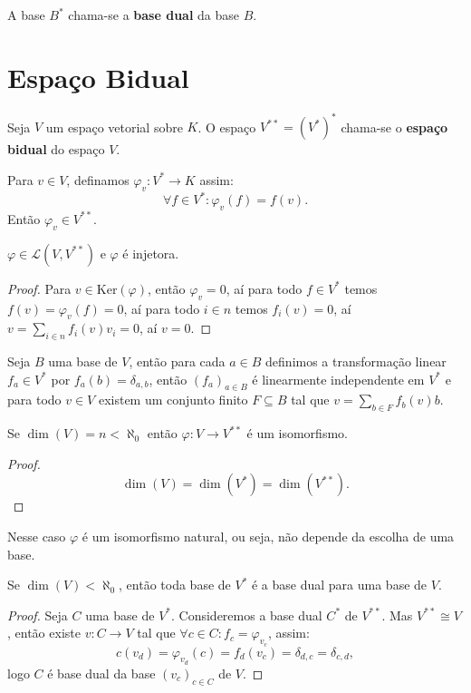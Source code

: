 \documentclass[11pt,twoside,a4paper]{book}
\begin{document}
\begin{definicao}
A base $B^*$ chama-se a \textbf{base dual} da base $B$.
\end{definicao}

\section{Espaço Bidual}

\begin{definicao}
Seja $V$ um espaço vetorial sobre $K$. O espaço $V^{**}=(V^*)^*$ chama-se o \textbf{espaço bidual} do espaço $V$.
\end{definicao}

\begin{definicao}
Para $v\in V$, definamos $\varphi_v:V^*\rightarrow K$ assim:
\[
\forall f\in V^*:\varphi_v(f)=f(v).
\]
Então $\varphi_v\in V^{**}$.
\end{definicao}

\begin{proposicao}
$\varphi\in\mathcal{L}(V,V^{**})$ e $\varphi$ é injetora.
\end{proposicao}
\begin{proof}
Para $v\in\mathrm{Ker}(\varphi)$, então $\varphi_v=0$, aí para todo $f\in V^*$ temos $f(v)=\varphi_v(f)=0$, aí para todo $i\in n$ temos $f_i(v)=0$, aí $v=\sum_{i\in n}f_i(v)v_i=0$, aí $v=0$.
\end{proof}

\noindent
Seja $B$ uma base de $V$, então para cada $a\in B$ definimos a transformação linear $f_a\in V^*$ por $f_a(b)=\delta_{a,b}$, então $(f_a)_{a\in B}$ é linearmente independente em $V^*$ e para todo $v\in V$ existem um conjunto finito $F\subseteq B$ tal que $v=\sum_{b\in F}f_b(v)b$.

\begin{corolario}
Se $\dim(V)=n<\aleph_0$ então $\varphi:V\rightarrow V^{**}$ é um isomorfismo.
\end{corolario}
\begin{proof}
\[
\dim(V)=\dim(V^*)=\dim(V^{**}).
\]
\end{proof}

\begin{observacao}
Nesse caso $\varphi$ é um isomorfismo natural, ou seja, não depende da escolha de uma base.
\end{observacao}

\begin{corolario}
Se $\dim(V)<\aleph_0$, então toda base de $V^*$ é a base dual para uma base de $V$.
\end{corolario}
\begin{proof}
Seja $C$ uma base de $V^*$. Consideremos a base dual $C^*$ de $V^{**}$. Mas $V^{**}\cong V$, então existe $v:C\rightarrow V$ tal que $\forall c\in C:f_c=\varphi_{v_c}$, assim:
\[
c(v_d)=\varphi_{v_d}(c)=f_d(v_c)=\delta_{d,c}=\delta_{c,d},
\]
logo $C$ é base dual da base $(v_c)_{c\in C}$ de $V$.
\end{proof}
\end{document}
